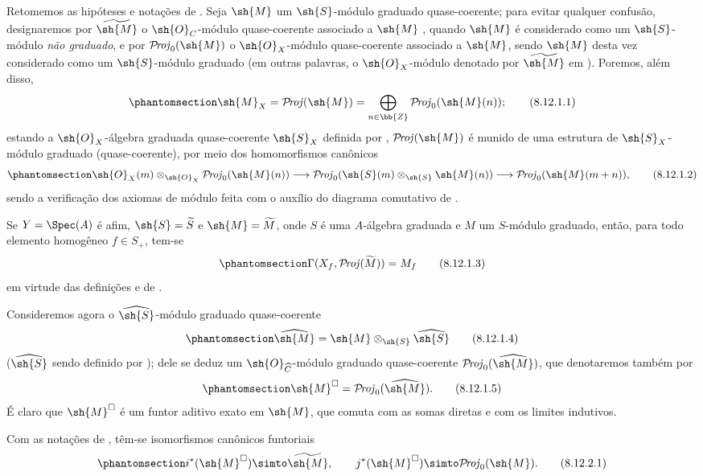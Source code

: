 \documentclass[oneside,10pt]{amsart}
\makeatletter
\newcommand{\ega@arrow}[2]{\mathchoice{#1}{#2}{#2}{#2}}
\renewcommand{\to}{\ega@arrow{\longrightarrow}{\rightarrow}}
\def\shProj{\mathcal{P}\!\mathit{roj}}
\newcommand{\oldpage}[2][]{\marginnote{\normalfont\footnotesize\textbf{#1}~|~#2}\ignorespaces}
\let\EGAOriginalLabel\label
\renewcommand{\label}[1]{\phantomsection\EGAOriginalLabel{#1}}
\makeatother
\begin{document}
\begin{env}[8.12.1]
\label{II.8.12.1}
Retomemos as hipóteses e notações de .
Seja $\sh{M}$ um $\sh{S}$-módulo graduado quase-coerente; para evitar qualquer confusão, designaremos por $\widetilde{\sh{M}}$ o $\sh{O}_C$-módulo
\oldpage[II]{192}
quase-coerente associado a $\sh{M}$ , quando $\sh{M}$ é considerado como um $\sh{S}$-módulo \emph{não graduado}, e por $\shProj_0(\sh{M})$ o $\sh{O}_X$-módulo quase-coerente associado a $\sh{M}$, sendo $\sh{M}$ desta vez considerado como um $\sh{S}$-módulo graduado (em outras palavras, o $\sh{O}_X$-módulo denotado por $\widetilde{\sh{M}}$ em ).
Poremos, além disso,
\[
\label{II.8.12.1.1}
  \sh{M}_X=\shProj(\sh{M})=\bigoplus_{n\in\bb{Z}}\shProj_0(\sh{M}(n));
\tag{8.12.1.1}
\]
estando a $\sh{O}_X$-álgebra graduada quase-coerente $\sh{S}_X$ definida por , $\shProj(\sh{M})$ é munido de uma estrutura de $\sh{S}_X$-módulo graduado (quase-coerente), por meio dos homomorfismos canônicos 
\[
\label{II.8.12.1.2}
  \sh{O}_X(m)\otimes_{\sh{O}_X}\shProj_0(\sh{M}(n))\to\shProj_0(\sh{S}(m)\otimes_\sh{S}\sh{M}(n))\to\shProj_0(\sh{M}(m+n)),
\tag{8.12.1.2}
\]
sendo a verificação dos axiomas de módulo feita com o auxílio do diagrama comutativo de .

Se $Y=\Spec(A)$ é afim, $\sh{S}=\widetilde{S}$ e $\sh{M}=\widetilde{M}$, onde $S$ é uma $A$-álgebra graduada e $M$ um $S$-módulo graduado, então, para todo elemento homogêneo $f\in S_+$, tem-se
\[
\label{II.8.12.1.3}
  \Gamma(X_f,\shProj(\widetilde{M}))=M_f
\tag{8.12.1.3}
\]
em virtude das definições e de .

Consideremos agora o $\widehat{\sh{S}}$-módulo graduado quase-coerente
\[
\label{II.8.12.1.4}
  \widehat{\sh{M}}=\sh{M}\otimes_\sh{S}\widehat{\sh{S}}
\tag{8.12.1.4}
\]
($\widehat{\sh{S}}$ sendo definido por ); dele se deduz um $\sh{O}_{\widehat{C}}$-módulo graduado quase-coerente $\shProj_0(\widehat{\sh{M}})$, que denotaremos também por
\[
\label{II.8.12.1.5}
  \sh{M}^\square=\shProj_0(\widehat{\sh{M}}).
\tag{8.12.1.5}
\]
É claro  que $\sh{M}^\square$ é um funtor aditivo exato em $\sh{M}$, que comuta com as somas diretas e com os limites indutivos.
\end{env}

\begin{proposition}[8.12.2]
\label{II.8.12.2}
Com as notações de , têm-se isomorfismos canônicos funtoriais
\[
\label{II.8.12.2.1}
  i^*(\sh{M}^\square)\simto\widetilde{\sh{M}},
  \qquad
  j^*(\sh{M}^\square)\simto\shProj_0(\sh{M}).
\tag{8.12.2.1}
\]
\end{proposition}
\end{document}
